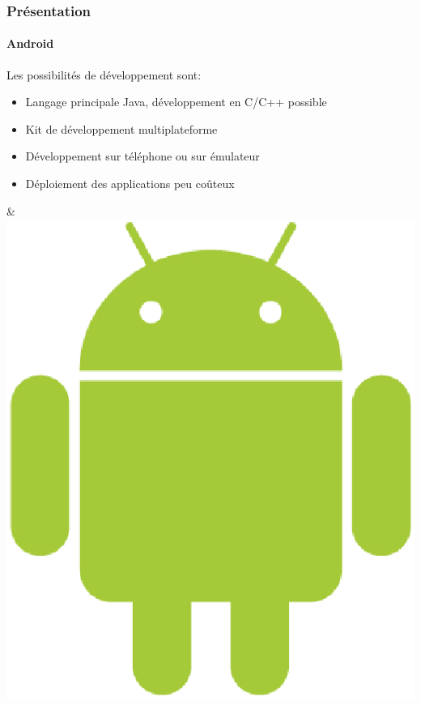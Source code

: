 \begin{frame}
\frametitle{Présentation}
\framesubtitle{Android}
	\begin{minipage}{8cm}
	Les possibilités de développement sont: \\ 

	\begin{itemize}
		\item Langage principale Java, développement en C/C++ possible
		\item Kit de développement multiplateforme
		\item Développement sur téléphone ou sur émulateur
		\item Déploiement des applications peu coûteux
	\end{itemize}
	\end{minipage} & \includegraphics[scale=0.2]{img/android.eps} 
\end{frame}




